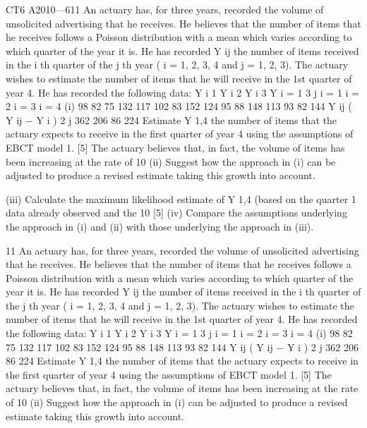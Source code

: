 \documentclass[a4paper,12pt]{article}
\begin{document}
 


CT6 A2010—611
An actuary has, for three years, recorded the volume of unsolicited advertising that he
receives. He believes that the number of items that he receives follows a Poisson
distribution with a mean which varies according to which quarter of the year it is. He
has recorded Y ij the number of items received in the i th quarter of the j th year ( i = 1,
2, 3, 4 and j = 1, 2, 3). The actuary wishes to estimate the number of items that he
will receive in the 1st quarter of year 4. He has recorded the following data:
Y i 1
Y i 2
Y i 3
Y i = 1
3 \sum
j
i = 1
i = 2
i = 3
i = 4
(i)
98
82
75
132
117
102
83
152
124
95
88
148
113
93
82
144
Y ij
\sum ( Y ij − Y i )
2
j
362
206
86
224
Estimate Y 1,4 the number of items that the actuary expects to receive in the
first quarter of year 4 using the assumptions of EBCT model 1.
[5]
The actuary believes that, in fact, the volume of items has been increasing at the rate
of 10%
(ii) Suggest how the approach in (i) can be adjusted to produce a revised estimate
taking this growth into account.

(iii) Calculate the maximum likelihood estimate of Y 1,4 (based on the quarter 1 data
already observed and the 10%
[5]
(iv) Compare the assumptions underlying the approach in (i) and (ii) with those
underlying the approach in (iii).



11
An actuary has, for three years, recorded the volume of unsolicited advertising that he
receives. He believes that the number of items that he receives follows a Poisson
distribution with a mean which varies according to which quarter of the year it is. He
has recorded Y ij the number of items received in the i th quarter of the j th year ( i = 1,
2, 3, 4 and j = 1, 2, 3). The actuary wishes to estimate the number of items that he
will receive in the 1st quarter of year 4. He has recorded the following data:
Y i 1
Y i 2
Y i 3
Y i = 1
3 \sum
j
i = 1
i = 2
i = 3
i = 4
(i)
98
82
75
132
117
102
83
152
124
95
88
148
113
93
82
144
Y ij
\sum ( Y ij − Y i )
2
j
362
206
86
224
Estimate Y 1,4 the number of items that the actuary expects to receive in the first quarter of year 4 using the assumptions of EBCT model 1.
[5]
The actuary believes that, in fact, the volume of items has been increasing at the rate of 10%
(ii) Suggest how the approach in (i) can be adjusted to produce a revised estimate taking this growth into account.
\end{document}
